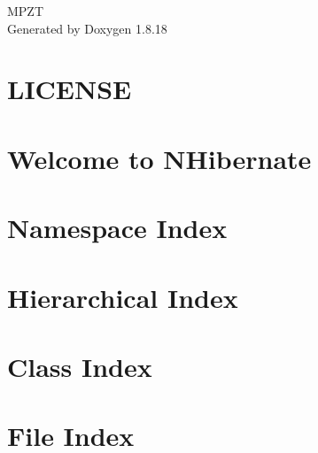 \let\mypdfximage\pdfximage\def\pdfximage{\immediate\mypdfximage}\documentclass[twoside]{book}
\newcommand{\+}{\discretionary{\mbox{\scriptsize$\hookleftarrow$}}{}{}}
\newcommand{\clearemptydoublepage}{%
  \newpage{\pagestyle{empty}\cleardoublepage}%
}
\begin{document}
\hypersetup{pageanchor=false,
             bookmarksnumbered=true,
             pdfencoding=unicode
            }
\begin{titlepage}
\vspace*{7cm}
\begin{center}%
{\Large M\+P\+ZT }\\
\vspace*{1cm}
{\large Generated by Doxygen 1.8.18}\\
\end{center}
\end{titlepage}
\clearemptydoublepage
{}
\tableofcontents
\clearemptydoublepage
{}
\hypersetup{pageanchor=true}

\chapter{L\+I\+C\+E\+N\+SE}
\label{md_packages__newtonsoft_8_json_811_80_81__l_i_c_e_n_s_e}

\chapter{Welcome to N\+Hibernate}
\label{md_packages__n_hibernate_85_82_87__n_hibernate_8readme}

\chapter{Namespace Index}

\chapter{Hierarchical Index}

\chapter{Class Index}

\chapter{File Index}

\end{document}
